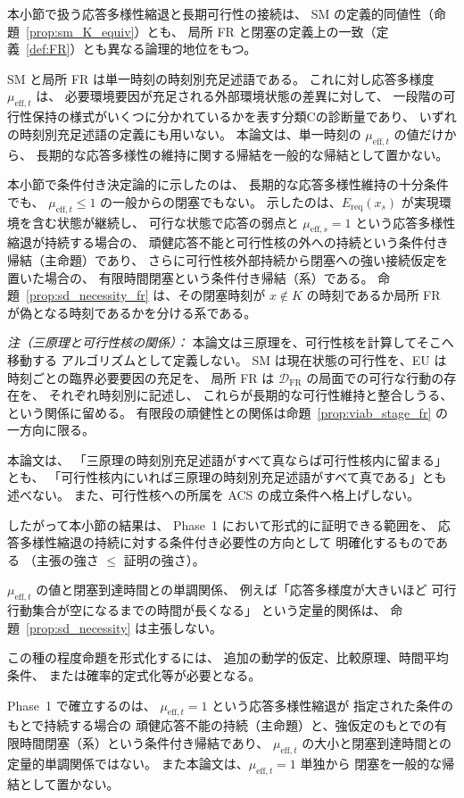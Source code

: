 \begin{remark}[条件付き必要性の論理的地位]
\label{rem:sd_status}
本小節で扱う応答多様性縮退と長期可行性の接続は、
SM の定義的同値性（命題~\ref{prop:sm_K_equiv}）とも、
局所 FR と閉塞の定義上の一致（定義~\ref{def:FR}）とも異なる論理的地位をもつ。

SM と局所 FR は単一時刻の時刻別充足述語である。
これに対し応答多様度 $\mu_{\mathrm{eff},t}$ は、
必要環境要因が充足される外部環境状態の差異に対して、
一段階の可行性保持の様式がいくつに分かれているかを表す分類Cの診断量であり、
いずれの時刻別充足述語の定義にも用いない。
本論文は、単一時刻の $\mu_{\mathrm{eff},t}$ の値だけから、
長期的な応答多様性の維持に関する帰結を一般的な帰結として置かない。

本小節で条件付き決定論的に示したのは、
長期的な応答多様性維持の十分条件でも、
$\mu_{\mathrm{eff},t}\le1$ の一般からの閉塞でもない。
示したのは、$E_{\mathrm{req}}(x_s)$ が実現環境を含む状態が継続し、
可行な状態で応答の弱点と $\mu_{\mathrm{eff},s}=1$ という応答多様性縮退が持続する場合の、
頑健応答不能と可行性核の外への持続という条件付き帰結（主命題）であり、
さらに可行性核外部持続から閉塞への強い接続仮定を置いた場合の、
有限時間閉塞という条件付き帰結（系）である。
命題~\ref{prop:sd_necessity_fr} は、その閉塞時刻が
$x\notin K$ の時刻であるか局所 FR が偽となる時刻であるかを分ける系である。

\textit{注（三原理と可行性核の関係）：}
本論文は三原理を、可行性核を計算してそこへ移動する
アルゴリズムとして定義しない。
SM は現在状態の可行性を、EU は時刻ごとの臨界必要要因の充足を、
局所 FR は $\mathcal{D}_{\mathrm{FR}}$ の局面での可行な行動の存在を、
それぞれ時刻別に記述し、
これらが長期的な可行性維持と整合しうる、という関係に留める。
有限段の頑健性との関係は命題~\ref{prop:viab_stage_fr} の一方向に限る。

本論文は、
「三原理の時刻別充足述語がすべて真ならば可行性核内に留まる」とも、
「可行性核内にいれば三原理の時刻別充足述語がすべて真である」とも述べない。
また、可行性核への所属を ACS の成立条件へ格上げしない。

したがって本小節の結果は、
Phase~1 において形式的に証明できる範囲を、
応答多様性縮退の持続に対する条件付き必要性の方向として
明確化するものである
（主張の強さ $\le$ 証明の強さ）。
\end{remark}

\begin{remark}
\label{rem:sd_degree}
$\mu_{\mathrm{eff},t}$ の値と閉塞到達時間との単調関係、
例えば「応答多様度が大きいほど
可行行動集合が空になるまでの時間が長くなる」
という定量的関係は、
命題~\ref{prop:sd_necessity} は主張しない。

この種の程度命題を形式化するには、
追加の動学的仮定、比較原理、時間平均条件、
または確率的定式化等が必要となる。

Phase~1 で確立するのは、
$\mu_{\mathrm{eff},t}=1$ という応答多様性縮退が
指定された条件のもとで持続する場合の
頑健応答不能の持続（主命題）と、強仮定のもとでの有限時間閉塞（系）という条件付き帰結であり、
$\mu_{\mathrm{eff},t}$ の大小と閉塞到達時間との
定量的単調関係ではない。
また本論文は、$\mu_{\mathrm{eff},t}=1$ 単独から
閉塞を一般的な帰結として置かない。
\end{remark}

